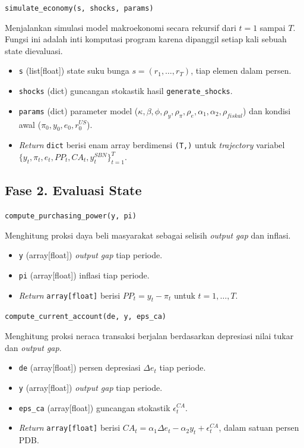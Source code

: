 \texttt{simulate\_economy(s, shocks, params)}

Menjalankan simulasi model makroekonomi secara rekursif dari $t = 1$ sampai $T$. Fungsi ini adalah inti komputasi program karena dipanggil setiap kali sebuah state dievaluasi.

\begin{itemize}
    \item \texttt{s} (list[float]) state suku bunga $s = (r_1, \dots, r_T)$, tiap elemen dalam persen.
    \item \texttt{shocks} (dict) guncangan stokastik hasil \texttt{generate\_shocks}.
    \item \texttt{params} (dict) parameter model ($\kappa, \beta, \phi, \rho_y, \rho_\pi, \rho_e, \alpha_1, \alpha_2, \rho_{fiskal}$) dan kondisi awal ($\pi_0, y_0, e_0, r_0^{US}$).
    \item \textit{Return} \texttt{dict} berisi enam array berdimensi \texttt{(T,)} untuk \textit{trajectory} variabel $\{y_t, \pi_t, e_t, PP_t, CA_t, y_t^{SBN}\}_{t=1}^{T}$.
\end{itemize}

\subsection*{Fase 2. Evaluasi State}

\texttt{compute\_purchasing\_power(y, pi)}

Menghitung proksi daya beli masyarakat sebagai selisih \textit{output gap} dan inflasi.

\begin{itemize}
    \item \texttt{y} (array[float]) \textit{output gap} tiap periode.
    \item \texttt{pi} (array[float]) inflasi tiap periode.
    \item \textit{Return} \texttt{array[float]} berisi $PP_t = y_t - \pi_t$ untuk $t = 1, \dots, T$.
\end{itemize}

\texttt{compute\_current\_account(de, y, eps\_ca)}

Menghitung proksi neraca transaksi berjalan berdasarkan depresiasi nilai tukar dan \textit{output gap}.

\begin{itemize}
    \item \texttt{de} (array[float]) persen depresiasi $\Delta e_t$ tiap periode.
    \item \texttt{y} (array[float]) \textit{output gap} tiap periode.
    \item \texttt{eps\_ca} (array[float]) guncangan stokastik $\epsilon_t^{CA}$.
    \item \textit{Return} \texttt{array[float]} berisi $CA_t = \alpha_1 \Delta e_t - \alpha_2 y_t + \epsilon_t^{CA}$, dalam satuan persen PDB.
\end{itemize}

